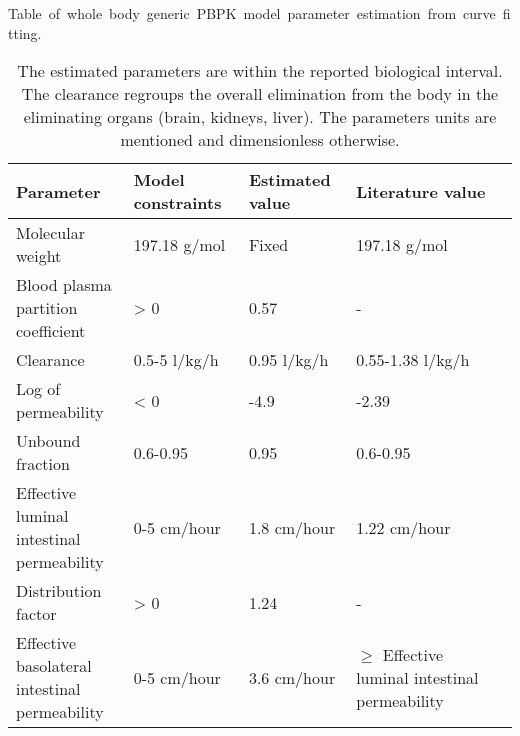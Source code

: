 \newpage
\begin{table}[h]
\caption[Whole-body generic PBPK model parameter estimation from curve fitting.]{\hbox{Table of whole body generic PBPK model parameter estimation from curve fitting.}}
\begin{center}
	\begin{tabular*}{\textwidth}{l @{\extracolsep{\fill}} llll}
	\hline
	Parameter  	                      & Model constraints & Estimated value & Literature value       \\ 
	\hline
	Molecular weight                  & 197.18 g/mol & Fixed & 197.18 g/mol \cite{knox2010drugbank}    \\
	\makecell[l]{Blood plasma\\ partition coefficient}         & > 0 & 0.57 & -       \\
	Clearance                         & 0.5-5 l/kg/h & 0.95 l/kg/h & 0.55-1.38 l/kg/h \cite{martinelli2003levodopa}         \\
	Log of permeability               & < 0 & -4.9 & -2.39          \\
	Unbound fraction                  & 0.6-0.95 & 0.95 & 0.6-0.95 \\
	\makecell[l]{Effective luminal \\ intestinal permeability} & 0-5 cm/hour & 1.8 cm/hour & 1.22 cm/hour \cite{lennernas1993effect}  \\
	Distribution factor               & > 0 & 1.24 & - \\
	\makecell[l]{Effective basolateral\\ intestinal permeability} & 0-5 cm/hour & 3.6 cm/hour & \makecell[l]{$\geq$ Effective luminal \\ intestinal permeability \cite{agoram2001predicting}} \\
	\hline
	\end{tabular*}
\end{center}
\caption*{The estimated parameters are within the reported biological interval. The clearance regroups the overall elimination from the body in the eliminating organs (brain, kidneys, liver). The parameters units are mentioned and dimensionless otherwise.}
\label{tbl:tbls2}%
\end{table}

